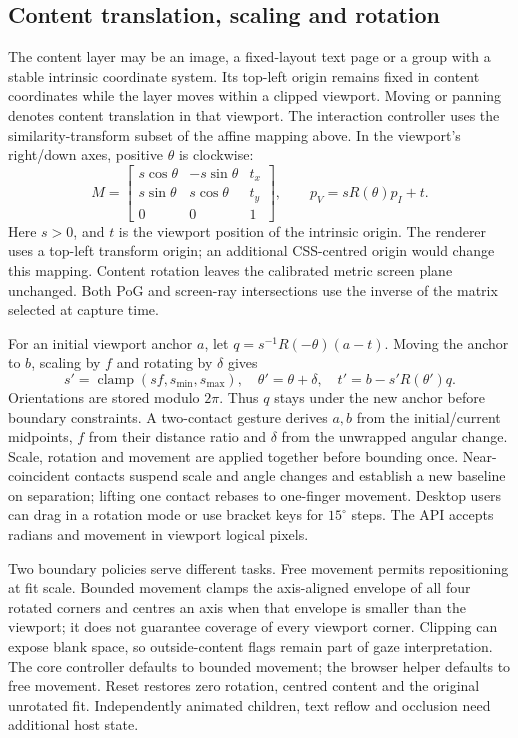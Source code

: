 \documentclass[sigconf,screen,nonacm]{acmart}
\begin{document}
\subsection{Content translation, scaling and rotation}
The content layer may be an image, a fixed-layout text page or a group with a
stable intrinsic coordinate system. Its top-left origin remains fixed in content
coordinates while the layer moves within a clipped viewport. Moving or panning
denotes content translation in that viewport. The interaction controller uses
the similarity-transform subset of the affine mapping above. In the viewport's
right/down axes, positive $\theta$ is clockwise:
\begin{equation}
 M=\begin{bmatrix}
 s\cos\theta&-s\sin\theta&t_x\\
 s\sin\theta&s\cos\theta&t_y\\0&0&1
 \end{bmatrix},\qquad p_V=sR(\theta)p_I+t.
 \label{eq:contentrotation}
\end{equation}
Here $s>0$, and $t$ is the viewport position of the intrinsic origin. The
renderer uses a top-left transform origin; an additional CSS-centred origin
would change this mapping. Content rotation leaves the calibrated metric screen
plane unchanged. Both PoG and screen-ray intersections use the inverse of the
matrix selected at capture time.

For an initial viewport anchor $a$, let $q=s^{-1}R(-\theta)(a-t)$. Moving the
anchor to $b$, scaling by $f$ and rotating by $\delta$ gives
\begin{equation}
 s'=\operatorname{clamp}(sf,s_{\min},s_{\max}),\quad
 \theta'=\theta+\delta,\quad
 t'=b-s'R(\theta')q.
 \label{eq:anchoredrotation}
\end{equation}
Orientations are stored modulo $2\pi$. Thus $q$ stays under the new anchor
before boundary constraints. A two-contact
gesture derives $a,b$ from the initial/current midpoints, $f$ from their distance
ratio and $\delta$ from the unwrapped angular change. Scale, rotation and movement
are applied together before bounding once. Near-coincident contacts suspend
scale and angle changes and establish a new baseline on separation; lifting one
contact rebases to one-finger movement. Desktop users can drag in a rotation mode
or use bracket keys for $15^\circ$ steps. The API accepts radians and movement in
viewport logical pixels.

Two boundary policies serve different tasks. Free movement permits repositioning
at fit scale. Bounded movement clamps the axis-aligned envelope of all four
rotated corners and centres an axis when that envelope is smaller than the
viewport; it does not guarantee coverage of every viewport corner. Clipping can
expose blank space, so outside-content flags remain part of gaze interpretation.
The core controller defaults to bounded movement; the browser helper defaults
to free movement. Reset restores zero rotation, centred content and the original
unrotated fit.
Independently animated children, text reflow and occlusion need additional host
state.
\end{document}
